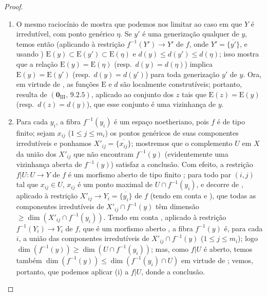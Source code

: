 \begin{proof}
\begin{enumerate}[label=(\roman*)]
  \item O mesmo raciocínio de  mostra que podemos nos limitar ao caso em que $Y$ é irredutível, com ponto genérico $\eta$.
  Se $y'$ é uma generização qualquer de $y$, temos então (aplicando  à restrição $f^{-1}(Y')\to Y'$ de $f$, onde $Y'=\overline{\{y'\}}$, e usando ) $\mathrm{E}(y)\subset\mathrm{E}(y')\subset\mathrm{E}(\eta)$ e $d(y)\leq d(y')\leq d(\eta)$; isso mostra que a relação $\mathrm{E}(y)=\mathrm{E}(\eta)$ (resp.\ $d(y)=d(\eta)$) implica $\mathrm{E}(y)=\mathrm{E}(y')$ (resp.\ $d(y)=d(y')$) para toda generização $y'$ de $y$.
  Ora, em virtude de , as funções $\mathrm{E}$ e $d$ são localmente construtíveis; portanto, resulta de $(\mathbf{0}_{\mathrm{III}},\,9.2.5)$, aplicado ao conjunto dos $z$ tais que $\mathrm{E}(z)=\mathrm{E}(y)$ (resp.\ $d(z)=d(y)$), que esse conjunto é uma vizinhança de $y$.

  \item Para cada $y_i$, a fibra $f^{-1}(y_i)$ é um espaço noetheriano, pois $f$ é de tipo finito; sejam $x_{ij}$ ($1\leq j\leq m_i$) os pontos genéricos de suas componentes irredutíveis e ponhamos $X'_{ij}=\overline{\{x_{ij}\}}$; mostremos que o complemento $U$ em $X$ da união dos $X'_{ij}$ que não encontram $f^{-1}(y)$ (evidentemente uma vizinhança aberta de $f^{-1}(y)$) satisfaz a conclusão.
  Com efeito, a restrição $f|U:U\to Y$ de $f$ é um morfismo aberto de tipo finito ; para todo par $(i,j)$ tal que $x_{ij}\in U$, $x_{ij}$ é um ponto maximal de $U\cap f^{-1}(y_i)$, e decorre de , aplicado à restrição $X'_{ij}\to Y_i=\overline{\{y_i\}}$ de $f$ (tendo em conta  e ), que todas as componentes irredutíveis de $X'_{ij}\cap f^{-1}(y)$ têm dimensão $\geq\dim(X'_{ij}\cap f^{-1}(y_i))$.
  Tendo em conta , aplicado à restrição $f^{-1}(Y_i)\to Y_i$ de $f$, que é um morfismo aberto , a fibra $f^{-1}(y)$ é, para cada $i$, a união das componentes irredutíveis de $X'_{ij}\cap f^{-1}(y)$ ($1\leq j\leq m_i$); logo $\dim(f^{-1}(y))\geq\dim(U\cap f^{-1}(y_i))$; mas, como $f|U$ é aberto, temos também $\dim(f^{-1}(y))\leq\dim(f^{-1}(y_i)\cap U)$ em virtude de ; vemos, portanto, que podemos aplicar (i) a $f|U$, donde a conclusão.
\end{enumerate}
\end{proof}

